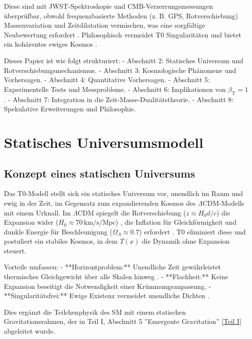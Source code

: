 \documentclass[12pt,a4paper]{article}
\newcommand{\Tfield}{T(x)}
\newcommand{\betaT}{\beta_{\text{T}}}
\begin{document}
	Diese sind mit JWST-Spektroskopie und CMB-Verzerrungsmessungen überprüfbar, obwohl frequenzbasierte Methoden (z. B. GPS, Rotverschiebung) Massenvariation und Zeitdilatation vermischen, was eine sorgfältige Neubewertung erfordert \cite{pascher_quantum_2025}. Philosophisch vermeidet T0 Singularitäten und bietet ein kohärentes ewiges Kosmos \cite{pascher_perspective_2025}.
	
	Dieses Papier ist wie folgt strukturiert:
	- Abschnitt 2: Statisches Universum und Rotverschiebungsmechanismus.
	- Abschnitt 3: Kosmologische Phänomene und Vorhersagen.
	- Abschnitt 4: Quantitative Vorhersagen.
	- Abschnitt 5: Experimentelle Tests und Messprobleme.
	- Abschnitt 6: Implikationen von \(\betaT = 1\).
	- Abschnitt 7: Integration in die Zeit-Masse-Dualitätstheorie.
	- Abschnitt 8: Spekulative Erweiterungen und Philosophie.
	
	\section{Statisches Universumsmodell}
	\label{sec:static_universe}
	
	\subsection{Konzept eines statischen Universums}
	\label{subsec:static_concept}
	
	Das T0-Modell stellt sich ein statisches Universum vor, unendlich im Raum und ewig in der Zeit, im Gegensatz zum expandierenden Kosmos des \(\Lambda\)CDM-Modells mit einem Urknall. Im \(\Lambda\)CDM spiegelt die Rotverschiebung (\(z \approx H_0 d / c\)) die Expansion wider (\(H_0 \approx 70 \, \text{km/s/Mpc}\)) \cite{Planck2020}, die Inflation für Gleichförmigkeit und dunkle Energie für Beschleunigung (\(\Omega_{\Lambda} \approx 0.7\)) erfordert \cite{Riess1998}. T0 eliminiert diese und postuliert ein stabiles Kosmos, in dem \(\Tfield\) die Dynamik ohne Expansion steuert.
	
	Vorteile umfassen:
	- **Horizontproblem:** Unendliche Zeit gewährleistet thermisches Gleichgewicht über alle Skalen hinweg \cite{pascher_messdifferenzen_2025}.
	- **Flachheit:** Keine Expansion beseitigt die Notwendigkeit einer Krümmungsanpassung.
	- **Singularitätsfrei:** Ewige Existenz vermeidet unendliche Dichten \cite{pascher_perspective_2025}.
	
	Dies ergänzt die Teilchenphysik des SM mit einem statischen Gravitationsrahmen, der in Teil I, Abschnitt 5 ''Emergente Gravitation'' \href{https://github.com/jpascher/T0-Time-Mass-Duality/tree/main/2/pdf/Deutsch/Bridging Quantum Mechanics and Relativity through Time-Mass Duality Part I Theoretical Foundations.pdf}{[Teil I]} abgeleitet wurde.
	
\end{document}
